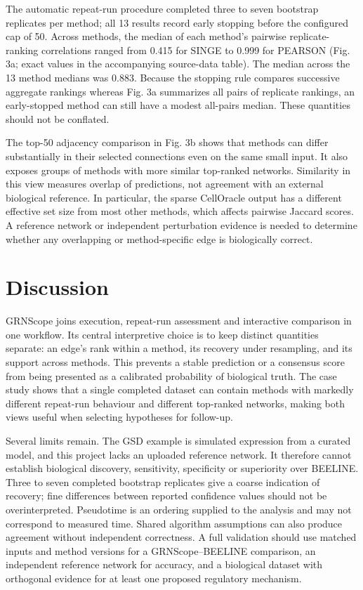 \documentclass[11pt]{article}
\begin{document}
The automatic repeat-run procedure completed three to seven bootstrap replicates per method; all 13 results record early stopping before the configured cap of 50. Across methods, the median of each method's pairwise replicate-ranking correlations ranged from 0.415 for SINGE to 0.999 for PEARSON (Fig. 3a; exact values in the accompanying source-data table). The median across the 13 method medians was 0.883. Because the stopping rule compares successive aggregate rankings whereas Fig. 3a summarizes all pairs of replicate rankings, an early-stopped method can still have a modest all-pairs median. These quantities should not be conflated.

The top-50 adjacency comparison in Fig. 3b shows that methods can differ substantially in their selected connections even on the same small input. It also exposes groups of methods with more similar top-ranked networks. Similarity in this view measures overlap of predictions, not agreement with an external biological reference. In particular, the sparse CellOracle output has a different effective set size from most other methods, which affects pairwise Jaccard scores. A reference network or independent perturbation evidence is needed to determine whether any overlapping or method-specific edge is biologically correct.

\section{Discussion}

GRNScope joins execution, repeat-run assessment and interactive comparison in one workflow. Its central interpretive choice is to keep distinct quantities separate: an edge's rank within a method, its recovery under resampling, and its support across methods. This prevents a stable prediction or a consensus score from being presented as a calibrated probability of biological truth. The case study shows that a single completed dataset can contain methods with markedly different repeat-run behaviour and different top-ranked networks, making both views useful when selecting hypotheses for follow-up.

Several limits remain. The GSD example is simulated expression from a curated model, and this project lacks an uploaded reference network. It therefore cannot establish biological discovery, sensitivity, specificity or superiority over BEELINE. Three to seven completed bootstrap replicates give a coarse indication of recovery; fine differences between reported confidence values should not be overinterpreted. Pseudotime is an ordering supplied to the analysis and may not correspond to measured time. Shared algorithm assumptions can also produce agreement without independent correctness. A full validation should use matched inputs and method versions for a GRNScope--BEELINE comparison, an independent reference network for accuracy, and a biological dataset with orthogonal evidence for at least one proposed regulatory mechanism.
\end{document}
